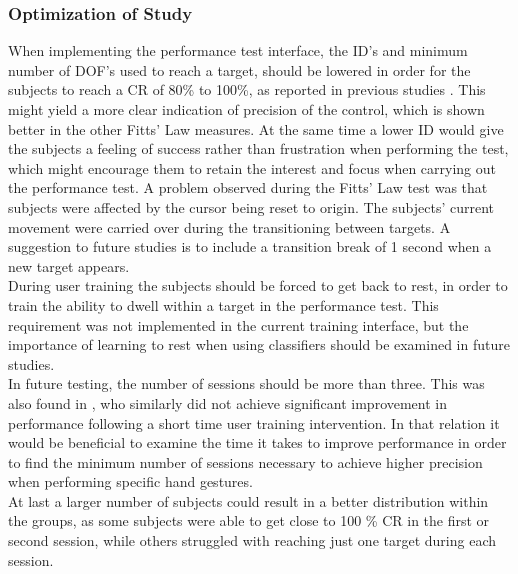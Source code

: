 \subsubsection{Optimization of Study}
When implementing the performance test interface, the ID's and minimum number of DOF's used to reach a target, should be lowered in order for the subjects to reach a CR of 80\% to 100\%, as reported in previous studies \cite{Scheme2013, Scheme2013a}. This might yield a more clear indication of precision of the control, which is shown better in the other Fitts' Law measures. At the same time a lower ID would give the subjects a feeling of success rather than frustration when performing the test, which might encourage them to retain the interest and focus when carrying out the performance test.
A problem observed during the Fitts' Law test was that subjects were affected by the cursor being reset to origin. The subjects' current movement were carried over during the transitioning between targets. A suggestion to future studies is to include a transition break of 1 second when a new target appears. \\
During user training the subjects should be forced to get back to rest, in order to train the ability to dwell within a target in the performance test. This requirement was not implemented in the current training interface, but the importance of learning to rest when using classifiers should be examined in future studies.\\
In future testing, the number of sessions should be more than three. This was also found in \cite{Pan2017}, who similarly did not achieve significant improvement in performance following a short time user training intervention. In that relation it would be beneficial to examine the time it takes to improve performance in order to find the minimum number of sessions necessary to achieve higher precision when performing specific hand gestures. \\
At last a larger number of subjects could result in a better distribution within the groups, as some subjects were able to get close to 100 \% CR in the first or second session, while others struggled with reaching just one target during each session. 
